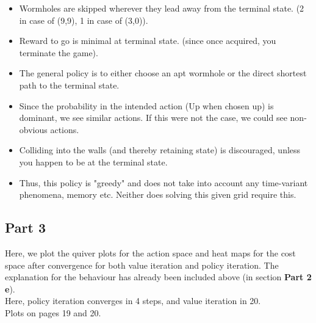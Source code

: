 \begin{itemize}
\item  Wormholes are skipped wherever they lead away from the terminal state. (2 in case of (9,9), 1 in case of (3,0)).
\item  Reward to go is minimal at terminal state. (since once acquired, you terminate the game).
\item  The general policy is to either choose an apt wormhole or the direct shortest path to the terminal state.
\item  Since the probability in the intended action (Up when chosen up) is dominant, we see similar actions. If this were not the case, we could see non-obvious actions.
\item Colliding into the walls (and thereby retaining state) is discouraged, unless you happen to be at the terminal state.
\item Thus, this policy is "greedy" and does not take into account any time-variant phenomena, memory etc. Neither does solving this given grid require this.
\end{itemize}

\subsection{Part 3}

Here, we plot the quiver plots for the action space and heat maps for the cost space after convergence for both value iteration and policy iteration. The explanation for the behaviour has already been included above (in section \textbf{Part 2 e}). \\

Here, policy iteration converges in 4 steps, and value iteration in 20. \\

Plots on pages 19 and 20.

